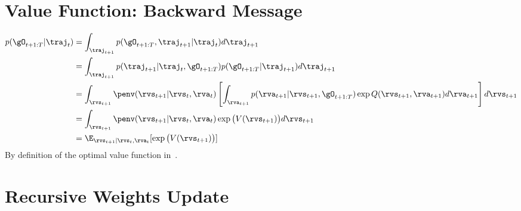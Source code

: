 \section{Value Function: Backward Message}
 \label{app:backward_message}
\begin{align}
    p(\gO_{t+1:T} | \traj_t) &=  \int_{\traj_{t+1}} p(\gO_{t+1:T}, \traj_{t+1} | \traj_t)d\traj_{t+1} \nonumber\\
     &=  \int_{\traj_{t+1}} p(\traj_{t+1} | \traj_{t}, \gO_{t+1:T}) p(\gO_{t+1:T} | \traj_{t+1}) d\traj_{t+1}  \nonumber\\
     &= \int_{\rvs_{t+1}}  \penv(\rvs_{t+1} | \rvs_t, \rva_t) \left[ \int_{\rva_{t+1}} p(\rva_{t+1} | \rvs_{t+1}, \gO_{t+1:T}) \exp Q(\rvs_{t+1}, \rva_{t+1}) d\rva_{t+1}  \right] d\rvs_{t+1}\nonumber\\
     &= \int_{\rvs_{t+1}} \penv(\rvs_{t+1} | \rvs_t, \rva_t)  \exp \big( V(\rvs_{t+1}) \big) d\rvs_{t+1}\nonumber\\
       &= \E_{\rvs_{t+1} | \rvs_t, \rva_t} [ \exp \big( V(\rvs_{t+1}) \big)]
\end{align}
By definition of the optimal value function in~\citep{levine2018reinforcement}.


\section{Recursive Weights Update}


